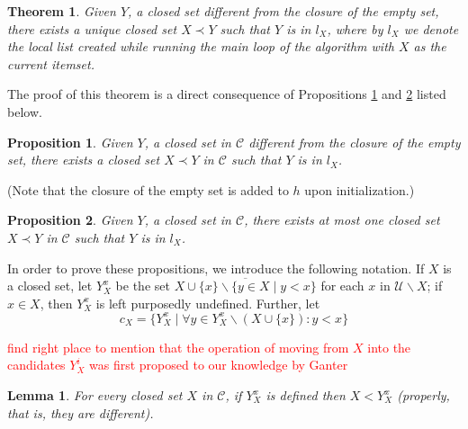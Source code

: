\documentclass{article}
\newtheorem{theorem}{Theorem}
\newtheorem{lemma}{Lemma}
\newtheorem{proposition}{Proposition}
\newcommand{\deleted}[1]{\textcolor{red}{#1}}
\newcommand{\st}[1]{%
  \sbox0{#1}%
  \usebox0%
  \llap{\rule[0.5ex]{\wd0}{0.4pt}}%
}
\def\U{\mathcal{U}}
\def\C{\mathcal{C}}
\newcommand{\cl}[1]{\overline{#1}}
\def\bef{\prec}
\begin{document}
\begin{theorem}\label{th:main}
Given $Y$, a closed set different from the closure of the empty set, 
there exists a unique closed set $X \bef Y$ such that $Y$ is in $l_X$, where by $l_X$ we denote the local list created while running the main loop of the algorithm with $X$ as the current itemset.
\end{theorem}


The proof of this theorem is a direct consequence of 
Propositions \ref{prop:exist} and \ref{prop:unique} listed below.
\begin{proposition}\label{prop:exist}
Given $Y$, a closed set in $\C$ different  from the closure of the empty set, there exists a closed set $X \bef Y$ in $\C$ such that $Y$ is in $l_X$.
\end{proposition}

(Note that the closure of the empty set is added to $h$ 
upon initialization.)

\begin{proposition}\label{prop:unique}
Given $Y$, a closed set in $\C$, there exists at most one closed set $X \bef Y$ in $\C$ such that $Y$ is in $l_X$. 
\end{proposition} 

In order to prove these propositions, 
we introduce the following notation. 
If $X$ is a closed set, let $Y^x_X$ be the set 
$\cl{X \cup \{x\} \backslash \{y \in X \mid y < x\}}$ 
for each $x$ in $\U \backslash X$; if $x \in X$, 
then $Y^x_X$ is left purposedly undefined. Further, let
$$
c_X=\{Y^x_X \mid \forall y \in Y^x_X \backslash (X \cup \{x\}): y < x\}
$$

\deleted{find right place to mention that the operation of
moving from $X$ into the candidates $Y^i_X$ was first
proposed to our knowledge by Ganter}



\begin{lemma}\label{lem:compare}
For every closed set $X$ in $\C$, if $Y^x_X$ is defined then 
$X < Y^x_X$ (properly, that is, they are different).
\end{lemma}
\end{document}
